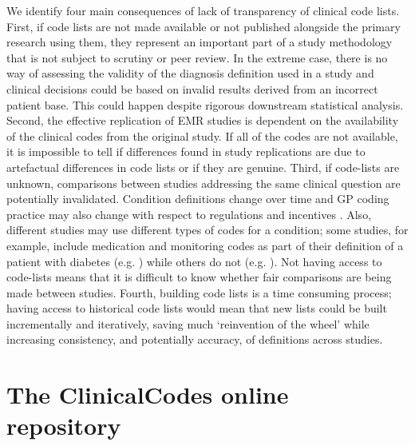 \documentclass[10pt]{article}
\begin{document}
We identify four main consequences of lack of transparency of clinical code lists.  First, if code lists are not made available or not published alongside the primary research using them, they represent an important part of a study methodology that is not subject to scrutiny or peer review. In the extreme case, there is no way of assessing the validity of the diagnosis definition used in a study and clinical decisions could be based on invalid results derived from an incorrect patient base.  This could happen despite rigorous downstream statistical analysis.  Second, the effective replication of EMR studies is dependent on the availability of the clinical codes from the original study.  If all of the codes are not available, it is impossible to tell if differences found in study replications are due to artefactual differences in code lists or if they are genuine.  Third, if code-lists are unknown, comparisons between studies addressing the same clinical question are potentially invalidated.  Condition definitions change over time and GP coding practice may also change with respect to regulations and incentives \cite{Hippisley-Cox2006}. Also, different studies may use different types of codes for a condition; some studies, for example, include medication and monitoring codes as part of their definition of a patient with diabetes (e.g. \cite{Mulnier2006}) while others do not (e.g. \cite{Kontopantelis2014}).  Not having access to code-lists means that it is difficult to know whether fair comparisons are being made between studies. Fourth, building code lists is a time consuming process; having access to historical code lists  would mean that new lists could be built incrementally and iteratively, saving much `reinvention of the wheel' while increasing consistency, and potentially accuracy, of definitions across studies.



\section*{The ClinicalCodes online repository}
\end{document}
